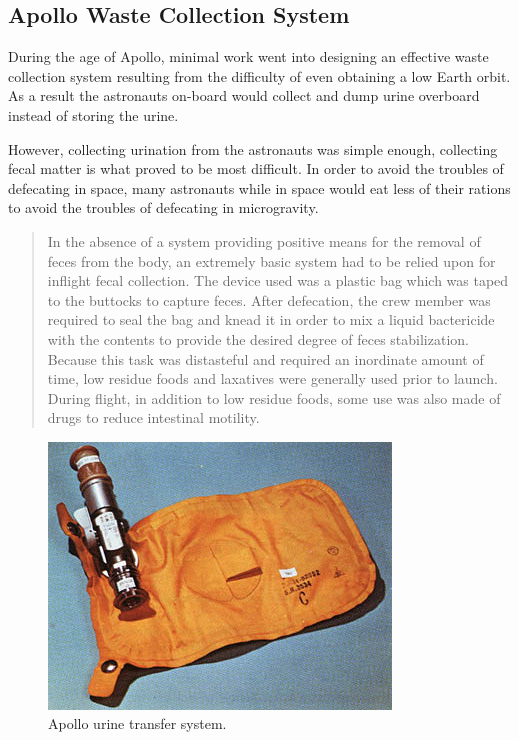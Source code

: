     \subsection{Apollo Waste Collection System}

    During the age of Apollo, minimal work went into designing an effective waste collection system resulting from the difficulty of even obtaining a low Earth orbit. As a result the astronauts on-board would collect and dump urine overboard instead of storing the urine. 

    However, collecting urination from the astronauts was simple enough, collecting fecal matter is what proved to be most difficult. In order to avoid the troubles of defecating in space, many astronauts while in space would eat less of their rations to avoid the troubles of defecating in microgravity.

    \begin{quote}
        In the absence of a system providing positive means for the removal of feces from the body, an extremely basic system had to be relied upon for inflight fecal collection. The device used was a plastic bag which was taped to the buttocks to capture feces. After defecation, the crew member was required to seal the bag and knead it in order to mix a liquid bactericide with the contents to provide the desired degree of feces stabilization. Because this task was distasteful and required an inordinate amount of time, low residue foods and laxatives were generally used prior to launch. During flight, in addition to low residue foods, some use was also made of drugs to reduce intestinal motility.\cite{apollo_bathroom}
    \end{quote}

    \pagebreak

    \begin{figure}[h]
        \centering
        \includegraphics[width = 0.5\linewidth]{figs/apollo_urine_bag.jpg}
        \caption[Apollo Urine Transfer System]{Apollo urine transfer system.}
        \label{fig:apollo_urine_bag}
    \end{figure}

